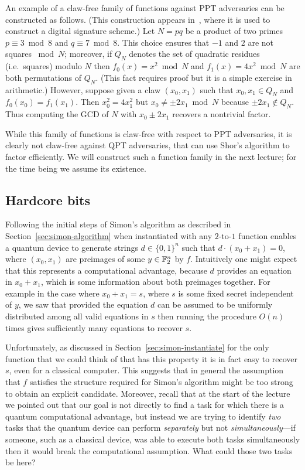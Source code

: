 An example of a claw-free family of functions against PPT adversaries can be constructed as follows. (This construction appears in~\cite{goldwasser1985paradoxical}, where it is used to construct a digital signature scheme.) Let $N=pq$ be a product of two primes $p\equiv 3 \bmod 8 $ and $q\equiv 7 \bmod 8$. This choice ensures that $-1$ and $2$ are not squares $\bmod N$; moreover, if $Q_N$ denotes the set of quadratic residues (i.e.\ squares) modulo $N$ then $f_0(x)=x^2 \bmod N$ and $f_1(x)=4x^2 \bmod N$ are both permutations of $Q_N$. (This fact requires proof but it is a simple exercise in arithmetic.) However, suppose given a claw $(x_0,x_1)$ such that $x_0,x_1\in Q_N$ and $f_0(x_0)=f_1(x_1)$. Then $x_0^2 = 4 x_1^2$ but $x_0 \neq \pm 2x_1 \bmod N$ because $\pm 2x_1\notin Q_N$. Thus computing the GCD of $N$ with $x_0\pm 2x_1$ recovers a nontrivial factor. 

While this family of functions is claw-free with respect to PPT adversaries, it is clearly not claw-free against QPT adversaries, that can use Shor's algorithm to factor efficiently. We will construct such a function family in the next lecture; for the time being we assume its existence. 


\subsection{Hardcore bits}

Following the initial steps of Simon's algorithm as described in Section~\ref{sec:simon-algorithm} when instantiated with any $2$-to-$1$ function enables a quantum device to generate strings $d\in\{0,1\}^n$ such that $d\cdot (x_0 + x_1) = 0$, where $(x_0,x_1)$ are preimages of some $y\in \mathbb{F}_2^n$ by $f$. Intuitively one might expect that this represents a computational advantage, because $d$ provides an equation in $x_0+x_1$, which is some information about both preimages together. For example in the case where $x_0+ x_1 = s$, where $s$ is some fixed secret independent of $y$, we saw that provided the equation $d$ can be assumed to be uniformly distributed among all valid equations in $s$ then running the procedure $O(n)$ times gives sufficiently many equations to recover $s$. 

Unfortunately, as discussed in Section~\ref{sec:simon-instantiate} for the only function that we could think of that has this property it is in fact easy to recover $s$, even for a classical computer. This suggests that in general the assumption that $f$ satisfies the structure required for Simon's algorithm might be too strong to obtain an explicit candidate. Moreover, recall that at the start of the lecture we pointed out that our goal is not directly to find a task for which there is a quantum computational advantage, but instead we are trying to identify \emph{two} tasks that the quantum device can perform \emph{separately} but not \emph{simultaneously}---if someone, such as a classical device, was able to execute both tasks simultaneously then it would break the computational assumption. What could those two tasks be here? 

